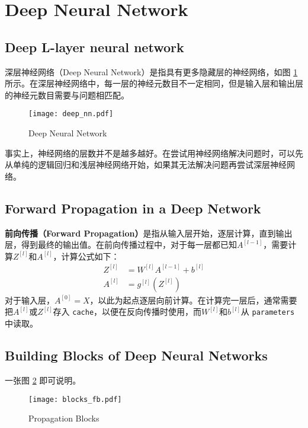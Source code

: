 \section{Deep Neural Network}

\subsection{Deep L-layer neural network}
深层神经网络（Deep Neural Network）是指具有更多隐藏层的神经网络，如图 \ref{fig:deep_nn} 所示。在深层神经网络中，每一层的神经元数目不一定相同，但是输入层和输出层的神经元数目需要与问题相匹配。
\begin{figure}[h!bt]
    \centering
    \texttt{[image: deep\_nn.pdf]}
    \caption[Deep Neural Network]{Deep Neural Network\setcounter{footnote}{0}\footnotemark}
    \label{fig:deep_nn}
\end{figure}

事实上，神经网络的层数并不是越多越好。在尝试用神经网络解决问题时，可以先从单纯的逻辑回归和浅层神经网络开始，如果其无法解决问题再尝试深层神经网络。

\subsection{Forward Propagation in a Deep Network}
\textbf{前向传播（Forward Propagation）}是指从输入层开始，逐层计算，直到输出层，得到最终的输出值。在前向传播过程中，对于每一层都已知$A^{[l-1]}$，需要计算$Z^{[l]}$和$A^{[l]}$，计算公式如下：
\begin{align}
    Z^{[l]} &= W^{[l]} A^{[l-1]} + b^{[l]} \\
    A^{[l]} &= g^{[l]}(Z^{[l]})
\end{align}
对于输入层，$A^{[0]} = X$，以此为起点逐层向前计算。在计算完一层后，通常需要把$A^{[l]}$或$Z^{[l]}$存入 \verb|cache|，以便在反向传播时使用，而$W^{[l]}$和$b^{[l]}$从 \verb|parameters| 中读取。

\subsection{Building Blocks of Deep Neural Networks}
一张图 \ref{fig:blocks_fb} 即可说明。
\begin{figure}[h!b]
    \centering
    \texttt{[image: blocks\_fb.pdf]}
    \caption{Propagation Blocks}
    \label{fig:blocks_fb}
\end{figure}


